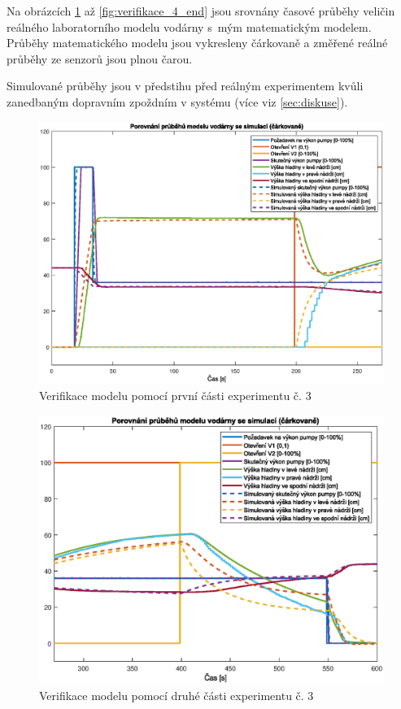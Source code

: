 \documentclass[conference]{IEEEtran}
\begin{document}
Na obrázcích \ref{fig:verifikace_3_start} až \ref{fig:verifikace_4_end} jsou srovnány časové průběhy veličin
reálného laboratorního modelu vodárny s~mým matematickým modelem. Průběhy matematického modelu jsou vykresleny čárkovaně
a změřené reálné průběhy ze senzorů jsou plnou čarou.

Simulované průběhy jsou v předstihu před reálným experimentem kvůli zanedbaným dopravním zpoždním v systému (více viz \ref{sec:diskuse}).

\begin{figure}[htbp]
    \centering
    \includegraphics[width=\linewidth]{verifikace_3_start.eps}
    \caption{Verifikace modelu pomocí první části experimentu č. 3}
    \label{fig:verifikace_3_start}
\end{figure}

\begin{figure}[htbp]
    \centering
    \includegraphics[width=\linewidth]{verifikace_3_end.eps}
    \caption{Verifikace modelu pomocí druhé části experimentu č. 3}
    \label{fig:verifikace_3_end}
\end{figure}
\end{document}
